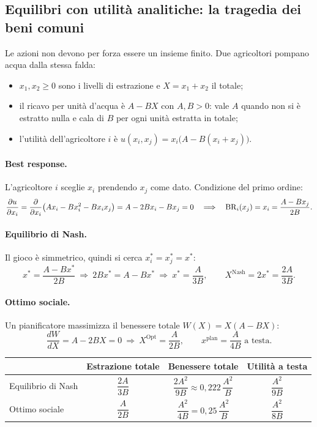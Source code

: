 \subsection{Equilibri con utilità analitiche: la tragedia dei beni comuni}

Le azioni non devono per forza essere un insieme finito. Due agricoltori pompano acqua
dalla stessa falda:
\begin{itemize}
  \item $x_1, x_2 \ge 0$ sono i livelli di estrazione e $X = x_1 + x_2$ il totale;
  \item il ricavo per unità d'acqua è $A - BX$ con $A, B > 0$: vale $A$ quando non si è
        estratto nulla e cala di $B$ per ogni unità estratta in totale;
  \item l'utilità dell'agricoltore $i$ è $u(x_i, x_j) = x_i\bigl(A - B(x_i + x_j)\bigr)$.
\end{itemize}

\paragraph{Best response.}
L'agricoltore $i$ sceglie $x_i$ prendendo $x_j$ come dato. Condizione del primo ordine:
\[
  \frac{\partial u}{\partial x_i}
  = \frac{\partial}{\partial x_i}\bigl(Ax_i - Bx_i^2 - Bx_ix_j\bigr)
  = A - 2Bx_i - Bx_j = 0
  \quad\Longrightarrow\quad
  \mathrm{BR}_i(x_j) = x_i = \frac{A - Bx_j}{2B}.
\]

\paragraph{Equilibrio di Nash.}
Il gioco è simmetrico, quindi si cerca $x_i^* = x_j^* = x^*$:
\[
  x^* = \frac{A - Bx^*}{2B} \ \Rightarrow\ 2Bx^* = A - Bx^* \ \Rightarrow\
  x^* = \frac{A}{3B},
  \qquad X^{\text{Nash}} = 2x^* = \frac{2A}{3B}.
\]

\paragraph{Ottimo sociale.}
Un pianificatore massimizza il benessere totale $W(X) = X(A - BX)$:
\[
  \frac{dW}{dX} = A - 2BX = 0 \ \Rightarrow\ X^{\text{Opt}} = \frac{A}{2B},
  \qquad x^{\text{plan}} = \frac{A}{4B} \text{ a testa}.
\]

\begin{center}
\renewcommand{\arraystretch}{1.4}
\begin{tabular}{lccc}
\toprule
 & Estrazione totale & Benessere totale & Utilità a testa \\
\midrule
Equilibrio di Nash & $\dfrac{2A}{3B}$ & $\dfrac{2A^2}{9B} \approx 0{,}222\,\dfrac{A^2}{B}$ & $\dfrac{A^2}{9B}$ \\[6pt]
Ottimo sociale     & $\dfrac{A}{2B}$  & $\dfrac{A^2}{4B} = 0{,}25\,\dfrac{A^2}{B}$ & $\dfrac{A^2}{8B}$ \\
\bottomrule
\end{tabular}
\end{center}

